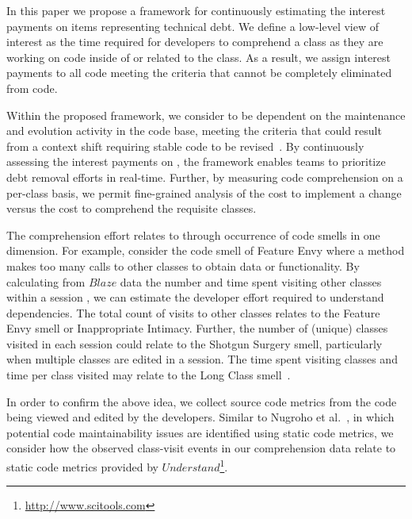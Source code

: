 
In this paper we propose a framework for continuously estimating the interest payments on items representing technical debt.  We define a low-level view of interest as the time required for developers to comprehend a class as they are working on code inside of or related to the class. As a result, we assign interest payments to all code meeting the criteria that \TD cannot be completely eliminated from code. 

Within the proposed framework, we consider \TD to be dependent on the maintenance and evolution activity in the code base, meeting the criteria that \TD could result from a context shift requiring stable code to be revised~\cite{Ozkaya_etal:2012}.  By continuously assessing the interest payments on \TD, the framework enables teams to prioritize debt removal efforts in real-time.  Further, by measuring code comprehension on a per-class basis, we permit fine-grained analysis of the cost to implement a change versus the cost to comprehend the requisite classes. 

The comprehension effort relates to \TD through occurrence of code smells in one dimension.  For example, consider the code smell of Feature Envy where a method makes too many calls to other classes to obtain data or functionality.  By calculating from $Blaze$ data the number  and time spent visiting other classes within a session , we can estimate the developer effort required to understand dependencies.  The total count of visits to other classes relates to the Feature Envy smell or Inappropriate Intimacy. Further, the number of (unique) classes visited in each session could  relate to the Shotgun Surgery smell, particularly when multiple classes are edited in a session. The time spent visiting classes and time per class visited may relate to the Long Class smell~\cite{Fowler_etal:1999}.  

In order to confirm the above idea, we collect source code metrics from the code being viewed and edited by the developers.  Similar to Nugroho et al.~\cite{Nugroho_etal:2011}, in which potential code maintainability issues are identified using static code metrics, we consider how the observed class-visit events in our comprehension data relate to static code metrics provided by $Understand$\footnote{\url{http://www.scitools.com}}.